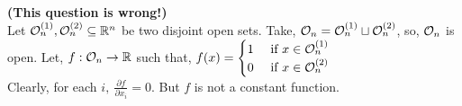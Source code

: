 \begin{soln}{6}
  \textbf{(This question is wrong!)}
   \\ 
   Let $ \mathcal{O}_n^{(1)}, \mathcal{O}_n^{(2)} \subseteq \mathbb{R}^n $ be two disjoint open sets. Take, $ \mathcal{O}_n = \mathcal{O}_n^{(1)}\sqcup\mathcal{O}_n^{(2)} $, so, $ \mathcal{O}_n $ is open. Let, $ f:\mathcal{O}_n \to \mathbb{R} $ such that, $ f(x) = \begin{cases}
    1 & \text{ if } x \in \mathcal{O}_n^{(1)} \\ 
    0 & \text{ if } x \in \mathcal{O}_n^{(2)}
   \end{cases} $ \\ 
   Clearly, for each $ i, \ \frac{\partial f}{\partial x_i} = 0 $. But $ f $ is not a constant function.
\end{soln}